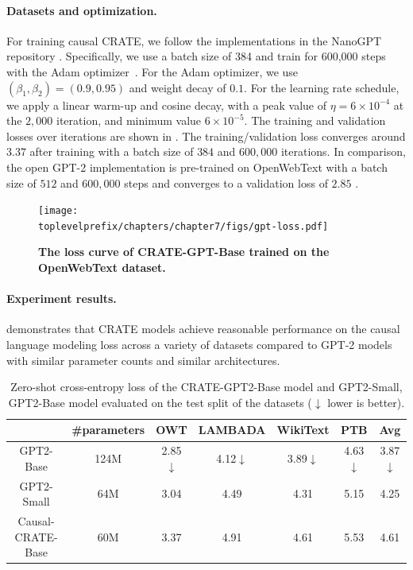 \documentclass[../../book-main.tex]{subfiles}
\begin{document}
\paragraph{Datasets and optimization.} For training causal CRATE, we follow the implementations in the NanoGPT repository \citep{nanogpt}. Specifically, we use a batch size of 384 and train for 600,000 steps with the Adam optimizer~\citep{kingma2014adam}. For the Adam optimizer, we use $(\beta_1, \beta_2)=(0.9, 0.95)$ and weight decay of $0.1$. For the learning rate schedule, we apply a linear warm-up and cosine decay, with a peak value of $\eta=6\times 10^{-4}$ at the $2,000$ iteration, and minimum value $6\times 10^{-5}$. The training and validation losses over iterations are shown in . The training/validation loss converges around $3.37$ after training with a batch size of $384$ and $600,000$ iterations. In comparison, the open GPT-2 implementation is pre-trained on OpenWebText with a batch size of $512$ and $600,000$ steps and converges to a validation loss of $2.85$ \citep{nanogpt}.  

\begin{figure}
    \centering
    \texttt{[image: \\toplevelprefix/chapters/chapter7/figs/gpt-loss.pdf]}
    \caption{\bf The loss curve of CRATE-GPT-Base trained on the OpenWebText dataset.}
    \label{fig:crate-text-evals}
\end{figure}

\paragraph{Experiment results.}

 demonstrates that CRATE models achieve reasonable performance on the causal language modeling loss across a variety of datasets compared to GPT-2 models with similar parameter counts and similar architectures.


\begin{table}
\def\arraystretch{1.1}
    \small
    \caption{\small Zero-shot cross-entropy loss of the CRATE-GPT2-Base model and GPT2-Small, GPT2-Base model evaluated on the test split of the datasets ($\downarrow$ lower is better). 
    }
    \centering
    \begin{tabular}{ccccccc}
    \hline
    & \#parameters & \textbf{OWT} & \textbf{LAMBADA} & \textbf{WikiText} & \textbf{PTB} & \textbf{Avg} \\
     \hline
     GPT2-Base  & {124M} & 2.85$\downarrow$ & 4.12$\downarrow$ & 3.89$\downarrow$ & 4.63$\downarrow$ & 3.87$\downarrow$ \\
     {GPT2-Small } &  {64M} & {3.04} & {4.49} & {4.31} & {5.15} & {4.25} \\
     Causal-CRATE-Base & {60M} & 3.37 & 4.91 & 4.61 & 5.53 & 4.61 \\
     \hline
    \end{tabular}
    \label{tab:gpt-eval}
\end{table} 
\end{document}
